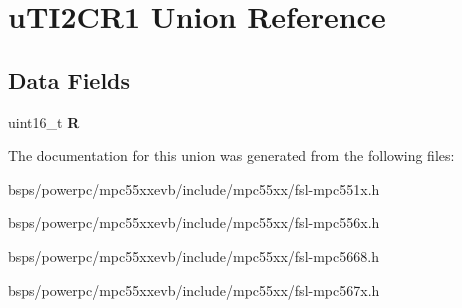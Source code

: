 \hypertarget{unionuTI2CR1}{}\section{u\+T\+I2\+C\+R1 Union Reference}
\label{unionuTI2CR1}
\subsection*{Data Fields}
\begin{DoxyCompactItemize}
\item 
\mbox{\label{unionuTI2CR1_ac4bce6245d71416531975f0ab34a2810}} 
uint16\+\_\+t {\bfseries R}
\end{DoxyCompactItemize}


The documentation for this union was generated from the following files\+:\begin{DoxyCompactItemize}
\item 
bsps/powerpc/mpc55xxevb/include/mpc55xx/fsl-\/mpc551x.\+h\item 
bsps/powerpc/mpc55xxevb/include/mpc55xx/fsl-\/mpc556x.\+h\item 
bsps/powerpc/mpc55xxevb/include/mpc55xx/fsl-\/mpc5668.\+h\item 
bsps/powerpc/mpc55xxevb/include/mpc55xx/fsl-\/mpc567x.\+h\end{DoxyCompactItemize}
